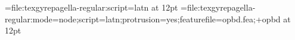 

 

\font\testa=file:texgyrepagella-regular:script=latn at 12pt
\font\testb=file:texgyrepagella-regular:mode=node;script=latn;protrusion=yes;featurefile=opbd.fea;+opbd at 12pt
\testa  \par
\testb  \par
\bye
